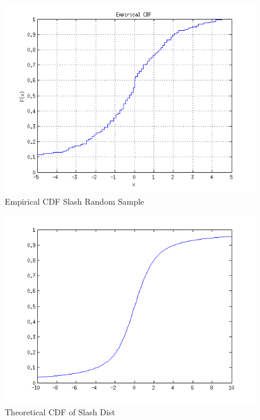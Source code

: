 \documentclass[12pt,a4paper]{article}
\begin{document}
\begin{figure}[ht!]
\begin{center}
\includegraphics[scale=.9]{q1_empirical.png}
\caption{Empirical CDF Slash Random Sample}
\label{q1 fig2}
\end{center}
\end{figure}
\FloatBarrier

\begin{figure}[ht!]
\begin{center}
\includegraphics[scale=.9]{q1_theoretical.png}
\caption{Theoretical CDF of Slash Dist}
\label{q1 fig1}
\end{center}
\end{figure}
\FloatBarrier
\end{document}
